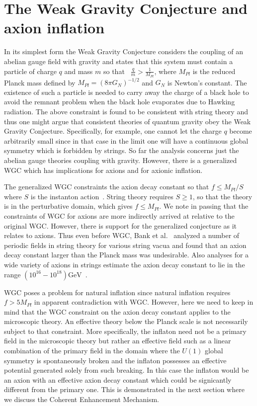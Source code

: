 \documentclass[12pt]{article}
\begin{document}
\section{The Weak Gravity Conjecture and axion inflation \label{sec:WeakGravityConjecture}}
In its simplest form the Weak Gravity Conjecture considers the coupling of an abelian gauge field with gravity and states that this system must contain a particle of charge $q$ and mass $m$ so that~\cite{ArkaniHamed:2006dz} $\frac{q}{m} > \frac{1}{M_{Pl}}$, where $M_{Pl}$ is the reduced Planck mass defined by $M_{Pl} = \left(8 \pi G_N\right)^{-1 / 2}$ and $G_N$ is Newton's constant.
The existence of such a particle is needed to carry away the charge of a black hole to avoid the remnant problem when the black hole evaporates due to Hawking radiation.
The above constraint is found to be consistent with string theory and thus one might argue that consistent theories of quantum gravity obey the Weak Gravity Conjecture.
Specifically, for example, one cannot let the charge $q$ become arbitrarily small since in that case in the limit one will have a continuous global symmetry which is forbidden by strings.
So far the analysis concerns just the abelian gauge theories coupling with gravity.
However, there is a generalized WGC which has implications for axions and for axionic inflation.

The generalized WGC constraints the axion decay constant so that $f \leq M_{Pl} / S$ where $S$ is the instanton action~\cite{Brown:2015iha, Brown:2015lia, Heidenreich:2015wga}.
String theory requires $S \geq 1$, so that the theory is in the perturbative domain, which gives $f \leq M_{Pl}$.
We note in passing that the constraints of WGC for axions are more indirectly arrived at relative to the original WGC.
However, there is support for the generalized conjecture as it relates to axions.
Thus even before WGC, Bank et al.~\cite{Banks:2003sx} analyzed a number of periodic fields in string theory for various string vacua and found that an axion decay constant larger than the Planck mass was undesirable.
Also analyses for a wide variety of axions in strings estimate the axion decay constant to lie in the range $\left(10^{16} - 10^{18}\right) \text{GeV}$~\cite{Svrcek:2006yi}.

WGC poses a problem for natural inflation since natural inflation requires $f > 5 M_{Pl}$ in apparent contradiction with WGC.
However, here we need to keep in mind that the WGC constraint on the axion decay constant applies to the microscopic theory.
An effective theory below the Planck scale is not necessarily subject to that constraint.
More specifically, the inflaton need not be a primary field in the microscopic theory but rather an effective field such as a linear combination of the primary field in the domain where the $U\left(1\right)$ global symmetry is spontaneously broken and the inflaton possesses an effective potential generated solely from such breaking.
In this case the inflaton would be an axion with an effective axion decay constant which could be signicantly different from the primary one.
This is demonstrated in the next section where we discuss the Coherent Enhancement Mechanism.
\end{document}
